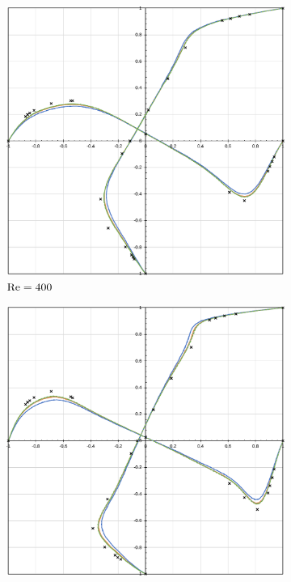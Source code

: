 \begin{figure}[h!]
\begin{subfigure}{0.4\textwidth}
        \includegraphics[width=\linewidth]{Figuras/Cavity/Re400.pdf}
        \caption{$\mathrm{Re}=400$}
    \end{subfigure}
    \begin{subfigure}{0.4\textwidth}
        \includegraphics[width=\linewidth]{Figuras/Cavity/Re1000.pdf}

\end{subfigure}
\end{figure}
